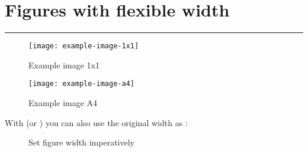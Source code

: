 \section{Figures with flexible width}

\hrule %

\begin{figure}[H]
  \texttt{[image: example-image-1x1]}
  \caption{Example image 1x1}%
  \label{fig:example-image-1x1}
\end{figure}

\begin{figure}[H]
  \texttt{[image: example-image-a4]}
  \caption{Example image A4}%
  \label{fig:example-image-a4}
\end{figure}

With \texttt{\adjincludegraphics} (or \texttt{\adjustimage}) you can also use the original width as \texttt{\width}:

\begin{figure}[H]
  \caption{Set figure width imperatively}%
  \label{fig:imperative-width}
\end{figure}
